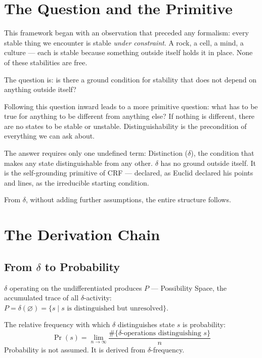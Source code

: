 \documentclass[12pt]{article}
\begin{document}
\bigskip
\tableofcontents
\newpage

\section{The Question and the Primitive}

This framework began with an observation that preceded any formalism:
every stable thing we encounter is stable \textit{under constraint}.
A rock, a cell, a mind, a culture --- each is stable because something
outside itself holds it in place. None of these stabilities are free.

The question is: is there a ground condition for stability that does
not depend on anything outside itself?

Following this question inward leads to a more primitive question:
what has to be true for anything to be different from anything else?
If nothing is different, there are no states to be stable or unstable.
Distinguishability is the precondition of everything we can ask about.

The answer requires only one undefined term: Distinction ($\delta$),
the condition that makes any state distinguishable from any other.
$\delta$ has no ground outside itself. It is the self-grounding
primitive of CRF --- declared, as Euclid declared his points and
lines, as the irreducible starting condition.

From $\delta$, without adding further assumptions, the entire
structure follows.

\section{The Derivation Chain}

\subsection{From $\delta$ to Probability}

$\delta$ operating on the undifferentiated produces $P$ ---
Possibility Space, the accumulated trace of all $\delta$-activity:
$P = \delta(\varnothing) = \{s \mid s\text{ is distinguished but
unresolved}\}$.

The relative frequency with which $\delta$ distinguishes state $s$
is probability:
\[
  \Pr(s) = \lim_{n\to\infty}
  \frac{\#\{\delta\text{-operations distinguishing }s\}}{n}
\]
Probability is not assumed. It is derived from $\delta$-frequency.
\end{document}
